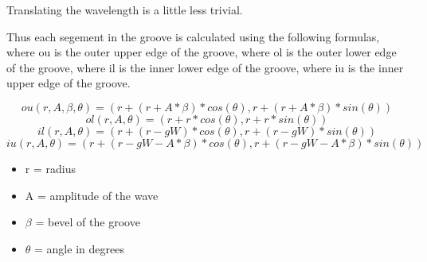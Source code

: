 \documentclass[12pt]{report}
\begin{document}
\begin{normalsize}
Translating the wavelength is a little less trivial.

Thus each segement in the groove is calculated using the following formulas, where ou is the outer upper edge of the groove, where ol is the outer lower edge of the groove, where il is the inner lower edge of the groove, where iu is the inner upper edge of the groove. 

\begin{equation}
ou(r,A,\beta,\theta) = (r+(r+A*\beta) * cos(\theta),r+(r+A*\beta)*sin(\theta))
\end{equation}
\begin{equation}
ol(r,A,\theta) = (r+r* cos(\theta),r+r*sin(\theta))
\end{equation}
\begin{equation}
il(r,A,\theta) = (r+(r-gW)*cos(\theta), r+(r-gW)*sin(\theta))
\end{equation}
\begin{equation}
iu(r,A,\theta) = (r+(r-gW-A*\beta)*cos(\theta), r+(r-gW-A*\beta)*sin(\theta))
\end{equation}
\begin{itemize}
\item r = radius
\item A = amplitude of the wave
\item $\beta$ = bevel of the groove
\item $\theta$ = angle in degrees
\end{itemize}
\end{normalsize}
\end{document}
